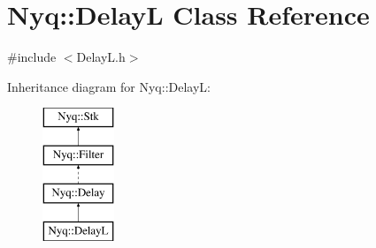 \hypertarget{class_nyq_1_1_delay_l}{}\section{Nyq\+:\+:DelayL Class Reference}
\label{class_nyq_1_1_delay_l}


{\ttfamily \#include $<$Delay\+L.\+h$>$}

Inheritance diagram for Nyq\+:\+:DelayL\+:\begin{figure}[H]
\begin{center}
\leavevmode
\includegraphics[height=4.000000cm]{class_nyq_1_1_delay_l}
\end{center}
\end{figure}
